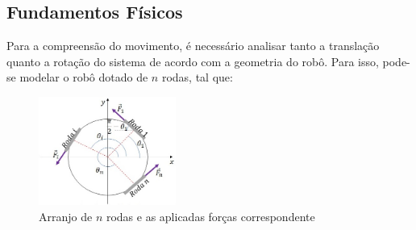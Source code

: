 \documentclass{article}
\begin{document}
\subsection{Fundamentos Físicos}

Para a compreensão do movimento, é necessário analisar tanto a translação quanto a rotação do sistema de acordo com a geometria do robô. Para isso, pode-se modelar o robô dotado de $n$ rodas, tal que:

\begin{figure}[H]
\centering
\includegraphics[width=0.4\textwidth]{roda.jpeg}
\caption{Arranjo de $n$ rodas e as aplicadas forças correspondente}
\label{Rotulo}
\end{figure}
\end{document}
